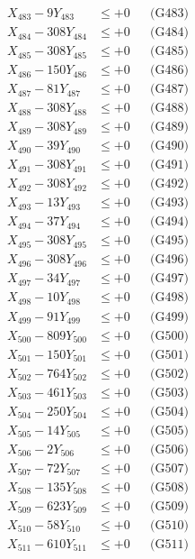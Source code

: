 \documentclass[a4paper,10pt]{article}
\begin{document}
{\begin{align}
X_{483} - 9Y_{483} &\leq +0 && \text{(G483)} \\
X_{484} - 308Y_{484} &\leq +0 && \text{(G484)} \\
X_{485} - 308Y_{485} &\leq +0 && \text{(G485)} \\
X_{486} - 150Y_{486} &\leq +0 && \text{(G486)} \\
X_{487} - 81Y_{487} &\leq +0 && \text{(G487)} \\
X_{488} - 308Y_{488} &\leq +0 && \text{(G488)} \\
X_{489} - 308Y_{489} &\leq +0 && \text{(G489)} \\
X_{490} - 39Y_{490} &\leq +0 && \text{(G490)} \\
\allowbreak
X_{491} - 308Y_{491} &\leq +0 && \text{(G491)} \\
X_{492} - 308Y_{492} &\leq +0 && \text{(G492)} \\
X_{493} - 13Y_{493} &\leq +0 && \text{(G493)} \\
X_{494} - 37Y_{494} &\leq +0 && \text{(G494)} \\
X_{495} - 308Y_{495} &\leq +0 && \text{(G495)} \\
X_{496} - 308Y_{496} &\leq +0 && \text{(G496)} \\
X_{497} - 34Y_{497} &\leq +0 && \text{(G497)} \\
X_{498} - 10Y_{498} &\leq +0 && \text{(G498)} \\
X_{499} - 91Y_{499} &\leq +0 && \text{(G499)} \\
X_{500} - 809Y_{500} &\leq +0 && \text{(G500)} \\
\allowbreak
X_{501} - 150Y_{501} &\leq +0 && \text{(G501)} \\
X_{502} - 764Y_{502} &\leq +0 && \text{(G502)} \\
X_{503} - 461Y_{503} &\leq +0 && \text{(G503)} \\
X_{504} - 250Y_{504} &\leq +0 && \text{(G504)} \\
X_{505} - 14Y_{505} &\leq +0 && \text{(G505)} \\
X_{506} - 2Y_{506} &\leq +0 && \text{(G506)} \\
X_{507} - 72Y_{507} &\leq +0 && \text{(G507)} \\
X_{508} - 135Y_{508} &\leq +0 && \text{(G508)} \\
X_{509} - 623Y_{509} &\leq +0 && \text{(G509)} \\
X_{510} - 58Y_{510} &\leq +0 && \text{(G510)} \\
\allowbreak
X_{511} - 610Y_{511} &\leq +0 && \text{(G511)} \\

\end{align}}
\end{document}
